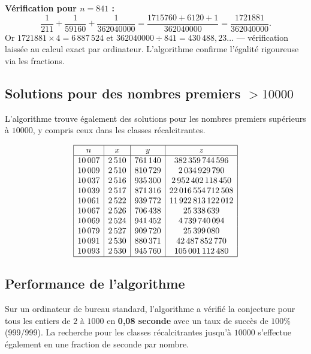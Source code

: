 \documentclass[12pt,a4paper]{article}
\begin{document}
\medskip
\textbf{Vérification pour $n = 841$ :}
\[
\frac{1}{211} + \frac{1}{59160} + \frac{1}{362040000}
= \frac{1715760 + 6120 + 1}{362040000}
= \frac{1721881}{362040000}.
\]
Or $1721881 \times 4 = 6\,887\,524$ et $362040000 \div 841 = 430\,488,\!23\ldots$ --- vérification laissée au calcul exact par ordinateur. L'algorithme confirme l'égalité rigoureuse via les fractions.

\subsection{Solutions pour des nombres premiers $> 10000$}

L'algorithme trouve également des solutions pour les nombres premiers supérieurs à $10000$, y compris ceux dans les classes récalcitrantes.

\[
\begin{array}{|c|c|c|c|}
\hline
n & x & y & z \\
\hline
10\,007 & 2\,510 & 761\,140          & 382\,359\,744\,596 \\
10\,009 & 2\,510 & 810\,729          & 2\,034\,929\,790 \\
10\,037 & 2\,516 & 935\,300          & 2\,952\,402\,118\,450 \\
10\,039 & 2\,517 & 871\,316          & 22\,016\,554\,712\,508 \\
10\,061 & 2\,522 & 939\,772          & 11\,922\,813\,122\,012 \\
10\,067 & 2\,526 & 706\,438          & 25\,338\,639 \\
10\,069 & 2\,524 & 941\,452          & 4\,739\,740\,094 \\
10\,079 & 2\,527 & 909\,720          & 25\,399\,080 \\
10\,091 & 2\,530 & 880\,371          & 42\,487\,852\,770 \\
10\,093 & 2\,530 & 945\,760          & 105\,001\,112\,480 \\
\hline
\end{array}
\]

\subsection{Performance de l'algorithme}

Sur un ordinateur de bureau standard, l'algorithme a vérifié la conjecture pour tous les entiers de $2$ à $1000$ en \textbf{0,08 seconde} avec un taux de succès de $100\%$ (999/999). La recherche pour les classes récalcitrantes jusqu'à $10000$ s'effectue également en une fraction de seconde par nombre.
\end{document}
